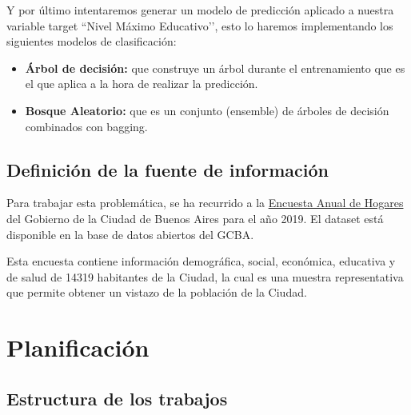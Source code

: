 \documentclass[a4paper]{article}
\begin{document}

        Y por último intentaremos generar un modelo de predicción aplicado a nuestra variable target ``Nivel Máximo Educativo’’, esto lo haremos implementando los siguientes modelos de clasificación:
        \begin{itemize}
            \item \textbf{Árbol de decisión:} que construye un árbol durante el entrenamiento que es el que aplica a la hora de realizar la predicción.
            \item \textbf{Bosque Aleatorio:} que es un conjunto (ensemble) de árboles de decisión combinados con bagging.
        \end{itemize}

    \subsection{Definición de la fuente de información}

        Para trabajar esta problemática, se ha recurrido a la \href{https://data.buenosaires.gob.ar/dataset/encuesta-anual-hogares/resource/3a45c563-396d-42de-ba93-8a93729e0723}{Encuesta Anual de Hogares} del Gobierno de la Ciudad de Buenos Aires para el año 2019. El dataset está disponible en la base de datos abiertos del GCBA.

        Esta encuesta contiene información demográfica, social, económica, educativa y de salud de 14319 habitantes de la Ciudad, la cual es una muestra representativa que permite obtener un vistazo de la población de la Ciudad.


\newpage

\section{Planificación}

    \subsection*{Estructura de los trabajos}
\end{document}
